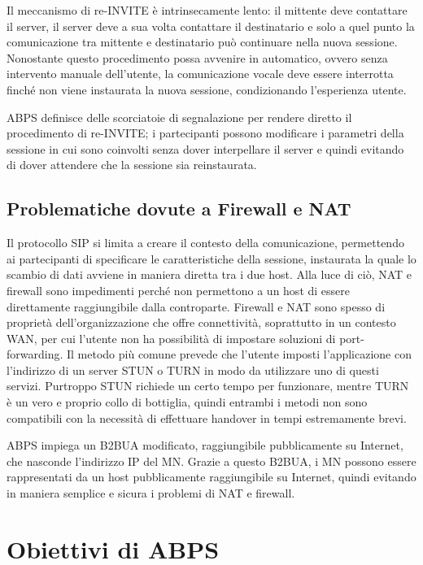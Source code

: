 \documentclass[12pt,a4paper,openright,twoside]{book}
\begin{document}
Il meccanismo di re-INVITE è intrinsecamente lento: il mittente deve
contattare il server, il server deve a sua volta contattare il
destinatario e solo a quel punto la comunicazione tra mittente e
destinatario può continuare nella nuova sessione. Nonostante questo
procedimento possa avvenire in automatico, ovvero senza intervento
manuale dell'utente, la comunicazione vocale deve essere interrotta
finché non viene instaurata la nuova sessione, condizionando
l'esperienza utente.

ABPS definisce delle scorciatoie di segnalazione per rendere diretto il
procedimento di re-INVITE; i partecipanti possono modificare i
parametri della sessione in cui sono coinvolti senza dover
interpellare il server e quindi evitando di dover attendere che la
sessione sia reinstaurata.

\subsection{Problematiche dovute a Firewall e NAT}

Il protocollo SIP si limita a creare il contesto della comunicazione,
permettendo ai partecipanti di specificare le caratteristiche della
sessione, instaurata la quale lo scambio di dati avviene in maniera
diretta tra i due host. Alla luce di ciò, NAT e firewall sono
impedimenti perché non permettono a un host di essere direttamente
raggiungibile dalla controparte. Firewall e NAT sono spesso di
proprietà dell'organizzazione che offre connettività, soprattutto in
un contesto WAN, per cui l'utente non ha possibilità di impostare
soluzioni di port-forwarding. Il metodo più comune prevede che
l'utente imposti l'applicazione con l'indirizzo di un server STUN o
TURN in modo da utilizzare uno di questi servizi. Purtroppo STUN
richiede un certo tempo per funzionare, mentre TURN è un vero e
proprio collo di bottiglia, quindi entrambi i metodi non sono
compatibili con la necessità di effettuare handover in tempi
estremamente brevi.

ABPS impiega un B2BUA modificato, raggiungibile pubblicamente su
Internet, che nasconde l'indirizzo IP del MN. Grazie a questo B2BUA, i
MN possono essere rappresentati da un host pubblicamente raggiungibile
su Internet, quindi evitando in maniera semplice e sicura i problemi
di NAT e firewall.

\section {Obiettivi di ABPS}
\end{document}
